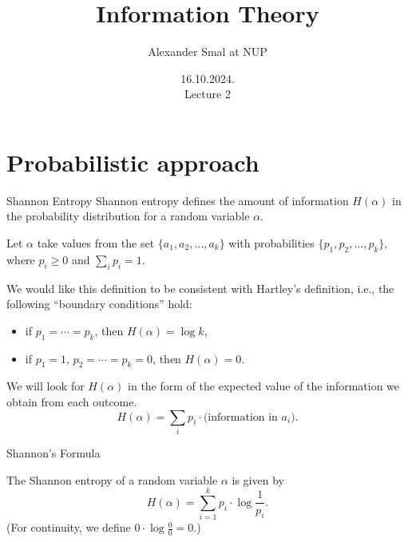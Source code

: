 \documentclass[aspectratio=169]{beamer}
\title{Information Theory}
\author{Alexander Smal at NUP}
\date{16.10.2024.\\ Lecture 2}
\newcommand{\seqn}[2]{{#1}_1,{#1}_2,\dotsc,{#1}_{#2}}
\begin{document}
\begin{frame}[plain]
    \maketitle
\end{frame}

\section{Probabilistic approach}
\begin{frame}{Shannon Entropy}
Shannon entropy defines the amount of information \(H(\alpha)\) in the probability distribution for a random variable \(\alpha\).
\medskip\pause

Let \(\alpha\) take values from the set \(\{\seqn{a}{k}\}\) with probabilities \(\{\seqn{p}{k}\}\), where \(p_i \ge 0\) and \(\sum_i p_i = 1\).
\medskip\pause

We would like this definition to be consistent with Hartley's definition, i.e., the following ``boundary conditions'' hold:
\begin{itemize}
    \item if \(p_1 = \dotsb = p_k\), then \(H(\alpha) = \log k\),
    \item if \(p_1 = 1\), \(p_2 = \dotsb = p_k = 0\), then \(H(\alpha) = 0\).
\end{itemize}
\medskip\pause

We will look for \(H(\alpha)\) in the form of the expected value of the information we obtain from each outcome.
\[
H(\alpha) = \sum_i p_i \cdot \text{(information in $a_i$)}.
\]
\end{frame}

\begin{frame}{Shannon's Formula}
\begin{definition}[Shannon, 1948]
    The Shannon entropy of a random variable \(\alpha\) is given by
    \[
    H(\alpha) = \sum_{i=1}^k p_i \cdot \log \frac{1}{p_i}.
    \]
    (For continuity, we define \(0 \cdot \log \frac{0}{0} = 0\).)
    \end{definition}
    \medskip\pause

\end{frame}
\end{document}
